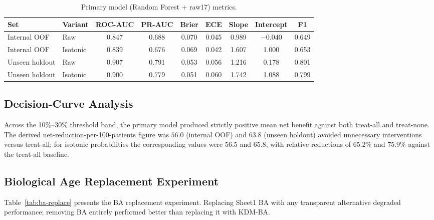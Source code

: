 \documentclass[11pt,a4paper]{article}
\begin{document}
\begin{table}[h!]
\centering
\small
\caption{Primary model (Random Forest + raw17) metrics.}
\label{tab:primary-metrics}
\begin{tabular}{llccccccc}
\toprule
Set & Variant & ROC-AUC & PR-AUC & Brier & ECE & Slope & Intercept & F1 \\
\midrule
Internal OOF & Raw & 0.847 & 0.688 & 0.070 & 0.045 & 0.989 & $-0.040$ & 0.649 \\
Internal OOF & Isotonic & 0.839 & 0.676 & 0.069 & 0.042 & 1.607 & 1.000 & 0.653 \\
Unseen holdout & Raw & 0.907 & 0.791 & 0.053 & 0.056 & 1.216 & 0.178 & 0.801 \\
Unseen holdout & Isotonic & 0.900 & 0.779 & 0.051 & 0.060 & 1.742 & 1.088 & 0.799 \\
\bottomrule
\end{tabular}
\end{table}

\subsection{Decision-Curve Analysis}
Across the 10\%--30\% threshold band, the primary model produced strictly positive mean net benefit
against both treat-all and treat-none. The derived net-reduction-per-100-patients
figure\cite{Vickers2016} was $56.0$ (internal OOF) and $63.8$ (unseen holdout) avoided unnecessary
interventions versus treat-all; for isotonic probabilities the corresponding values were $56.5$ and
$65.8$, with relative reductions of $65.2\%$ and $75.9\%$ against the treat-all baseline.

\subsection{Biological Age Replacement Experiment}
\label{sec:results-ba-replace}

Table~\ref{tab:ba-replace} presents the BA replacement experiment. Replacing Sheet1 BA with
any transparent alternative degraded performance; removing BA entirely performed better than
replacing it with KDM-BA.
\end{document}
